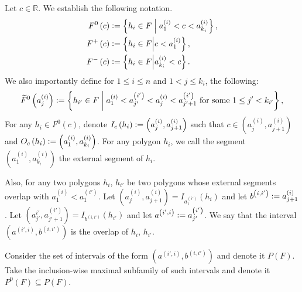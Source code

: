 \documentclass[12pt]{article}
\theoremstyle{definition}
\newcommand{\defeq}{\vcentcolon=}
\begin{document}
     Let $c \in \mathbb{R}$.
     We establish the following notation.
     \begin{align*}
         F^{0}\left(c\right) &\defeq
         \left\{h_{i} \in F \;\middle|\;
         a_{1}^{\left(i\right)}
         < c < a_{k_{i}}^{\left(i\right)}\right\}, \\
         F^{+}\left(c\right) &\defeq
         \left\{h_{i} \in F \middle|
         c < a_{1}^{\left(i\right)}\right\},\\
         F^{-}\left(c\right) &\defeq
         \left\{h_{i} \in F
         \middle| a_{k_{i}}^{\left(i\right)} < c\right\}.
     \end{align*}
     We also importantly define for
     $1 \leq i \leq n$ and 
     $1 < j \leq k_{i}$, 
     the following:
     \begin{gather*}
         \widetilde{F}^{0}\left(a_{j}^{\left(i\right)}\right)
         \defeq \left\{
         h_{i'} \in F \;\middle|\;
         a_{1}^{\left(i\right)} < a_{j'}^{\left(i'\right)}
         < a_{j}^{\left(i\right)}
         < a_{j'+1}^{\left(i'\right)}
         \text{ for some }
         1 \leq j' < k_{i'} \right\},
     \end{gather*}
     For any $h_{i} \in F^{0}\left(c\right)$,
     denote $I_{c}\left(h_{i}\right)
     \defeq \left(a_{j}^{\left(i\right)},
     a_{j+1}^{\left(i\right)}\right)$ 
     such that $c \in 
     \left(a_{j}^{\left(i\right)},
     a_{j+1}^{\left(i\right)}\right)$ 
     and $O_{c}\left(h_{i}\right)
     \defeq \left(a_{1}^{\left(i\right)},
     a_{k_{i}}^{\left(i\right)}\right)$.
     For any polygon $h_{i}$,
     we call the segment
     $\left(a_{1}^{\left(i\right)},
     a_{k_{i}}^{\left(i\right)}\right)$
     the external
     segment of $h_{i}$.

     Also, for any two polygons
     $h_{i}$, $h_{i'}$ be two
     polygons whose external segments
     overlap with
     $a_1^{\left(i\right)} < a_1^{\left(i'\right)}$.
     Let $\left(a_{j}^{\left(i\right)},
     a_{j+1}^{\left(i\right)}\right) =
     I_{a_1^{\left(i'\right)}}\left(h_{i}\right)$
     and let
     $b^{\left(i, i'\right)} \defeq a_{j+1}^{\left(i\right)}$.
     Let $\left(a_{j'}^{i'}, a_{j'+1}^{\left(i'\right)}\right)
     = I_{b^{\left(i,i'\right)}}\left(h_{i'}\right)$ 
     and let $a^{\left(i',i\right)}
     \defeq a_{j'}^{\left(i'\right)}$.
     We say that the interval
     $\left(a^{\left(i', i\right)},
     b^{\left(i, i'\right)}\right)$ 
     is the overlap of $h_{i}$, $h_{i'}$.

     Consider the set of intervals
     of the form $\left(a^{\left(i',i\right)},
     b^{\left(i,i'\right)}\right)$ 
     and denote it $P\left(F\right)$.
     Take the inclusion-wise maximal
     subfamily of such intervals
     and denote it $P^{0}\left(F\right)
     \subseteq P\left(F\right)$.
     
\end{document}
